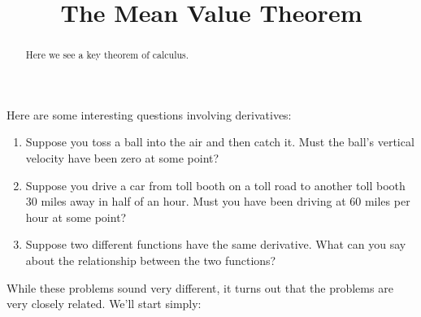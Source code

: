 \documentclass{ximera}
\title[Dig-In:]{The Mean Value Theorem}
\begin{document}
\begin{abstract}
  Here we see a key theorem of calculus.
\end{abstract}
\maketitle


Here are some interesting questions involving derivatives:

\begin{enumerate}
\item Suppose you toss a ball into the air and then catch it. Must the
  ball's vertical velocity have been zero at some point?
\item Suppose you drive a car from toll booth on a toll road to
  another toll booth $30$ miles away in half of an hour. Must you have
  been driving at $60$ miles per hour at some point?
\item Suppose two different functions have the same derivative. What
  can you say about the relationship between the two functions?
\end{enumerate}

While these problems sound very different, it turns out that the
problems are very closely related. We'll start simply:
\end{document}
